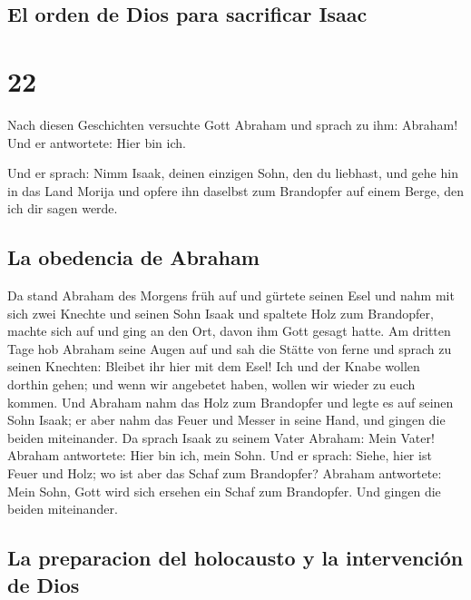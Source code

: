 \hypertarget{el-orden-de-dios-para-sacrificar-isaac}{%
\subsection{El orden de Dios para sacrificar
Isaac}\label{el-orden-de-dios-para-sacrificar-isaac}}

\hypertarget{section-21}{%
\section{22}\label{section-21}}

 Nach diesen Geschichten versuchte Gott Abraham und sprach
zu ihm: Abraham! Und er antwortete: Hier bin ich.

 Und er sprach: Nimm Isaak, deinen einzigen Sohn, den du
liebhast, und gehe hin in das Land Morija und opfere ihn daselbst zum
Brandopfer auf einem Berge, den ich dir sagen werde.

\hypertarget{la-obedencia-de-abraham}{%
\subsection{La obedencia de Abraham}\label{la-obedencia-de-abraham}}

 Da stand Abraham des Morgens früh auf und gürtete seinen
Esel und nahm mit sich zwei Knechte und seinen Sohn Isaak und spaltete
Holz zum Brandopfer, machte sich auf und ging an den Ort, davon ihm Gott
gesagt hatte.  Am dritten Tage hob Abraham seine Augen auf
und sah die Stätte von ferne  und sprach zu seinen
Knechten: Bleibet ihr hier mit dem Esel! Ich und der Knabe wollen
dorthin gehen; und wenn wir angebetet haben, wollen wir wieder zu euch
kommen.  Und Abraham nahm das Holz zum Brandopfer und
legte es auf seinen Sohn Isaak; er aber nahm das Feuer und Messer in
seine Hand, und gingen die beiden miteinander.  Da sprach
Isaak zu seinem Vater Abraham: Mein Vater! Abraham antwortete: Hier bin
ich, mein Sohn. Und er sprach: Siehe, hier ist Feuer und Holz; wo ist
aber das Schaf zum Brandopfer?  Abraham antwortete: Mein
Sohn, Gott wird sich ersehen ein Schaf zum Brandopfer. Und gingen die
beiden miteinander.

\hypertarget{la-preparacion-del-holocausto-y-la-intervenciuxf3n-de-dios}{%
\subsection{La preparacion del holocausto y la intervención de
Dios}\label{la-preparacion-del-holocausto-y-la-intervenciuxf3n-de-dios}}

